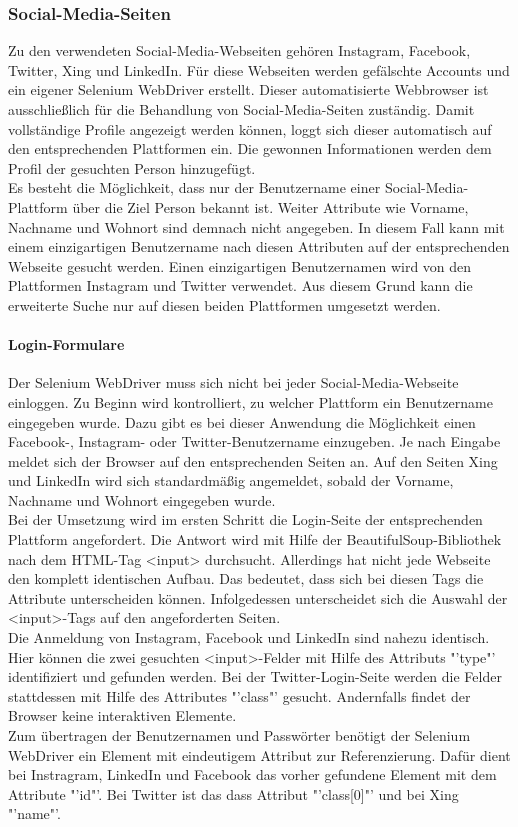 			\subsubsection{Social-Media-Seiten}
			\label{subsubsec:SocialMediaSeiten}
			Zu den verwendeten Social-Media-Webseiten gehören Instagram, Facebook, Twitter, Xing und LinkedIn. Für diese Webseiten werden gefälschte Accounts und ein eigener Selenium WebDriver erstellt. Dieser automatisierte Webbrowser ist ausschließlich für die Behandlung von Social-Media-Seiten zuständig. Damit vollständige Profile angezeigt werden können, loggt sich dieser automatisch auf den entsprechenden Plattformen ein. Die gewonnen Informationen werden dem Profil der gesuchten Person hinzugefügt.\\
			Es besteht die Möglichkeit, dass nur der Benutzername einer Social-Media-Plattform über die Ziel Person bekannt ist. Weiter Attribute wie Vorname, Nachname und Wohnort sind demnach nicht angegeben. In diesem Fall kann mit einem einzigartigen Benutzername nach diesen Attributen auf der entsprechenden Webseite gesucht werden. Einen einzigartigen Benutzernamen wird von den Plattformen Instagram und Twitter verwendet. Aus diesem Grund kann die erweiterte Suche nur auf diesen beiden Plattformen umgesetzt werden.
			
			\paragraph{Login-Formulare}
			Der Selenium WebDriver muss sich nicht bei jeder Social-Media-Webseite einloggen. Zu Beginn wird kontrolliert, zu welcher Plattform ein Benutzername eingegeben wurde. Dazu gibt es bei dieser Anwendung die Möglichkeit einen Facebook-, Instagram- oder Twitter-Benutzername einzugeben. Je nach Eingabe meldet sich der Browser auf den entsprechenden Seiten an. Auf den Seiten Xing und LinkedIn wird sich standardmäßig  angemeldet, sobald der Vorname, Nachname und Wohnort eingegeben wurde.\\
			Bei der Umsetzung wird im ersten Schritt die Login-Seite der entsprechenden Plattform angefordert. Die Antwort wird mit Hilfe der BeautifulSoup-Bibliothek nach dem HTML-Tag <input> durchsucht. Allerdings hat nicht jede Webseite den komplett identischen Aufbau. Das bedeutet, dass sich bei diesen Tags die Attribute unterscheiden können. Infolgedessen unterscheidet sich die Auswahl der <input>-Tags auf den angeforderten Seiten.\\
			Die Anmeldung von Instagram, Facebook und LinkedIn sind nahezu identisch. Hier können die zwei gesuchten <input>-Felder mit Hilfe des Attributs "'type"' identifiziert und gefunden werden. Bei der Twitter-Login-Seite werden die Felder stattdessen mit Hilfe des Attributes "'class"' gesucht. Andernfalls findet der Browser keine interaktiven Elemente.\\
			Zum übertragen der Benutzernamen und Passwörter benötigt der Selenium WebDriver ein Element mit eindeutigem Attribut zur Referenzierung. Dafür dient bei Instragram, LinkedIn und Facebook das vorher gefundene Element mit dem Attribute "'id"'. Bei Twitter ist das dass Attribut "'class[0]"' und bei Xing "'name"'.
			 
